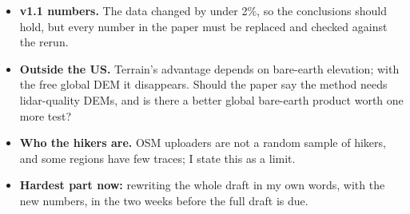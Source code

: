 \documentclass[10pt,twocolumn,letterpaper]{article}
\begin{document}
\begin{itemize}\setlength\itemsep{1pt}
\item \textbf{v1.1 numbers.} The data changed by under 2\%, so the conclusions should hold, but every number in the paper must be replaced and checked against the rerun.
\item \textbf{Outside the US.} Terrain's advantage depends on bare-earth elevation; with the free global DEM it disappears. Should the paper say the method needs lidar-quality DEMs, and is there a better global bare-earth product worth one more test?
\item \textbf{Who the hikers are.} OSM uploaders are not a random sample of hikers, and some regions have few traces; I state this as a limit.
\item \textbf{Hardest part now:} rewriting the whole draft in my own words, with the new numbers, in the two weeks before the full draft is due.
\end{itemize}

{\footnotesize
\setlength{\itemsep}{0pt}\setlength{\parskip}{0pt}


}
\end{document}
